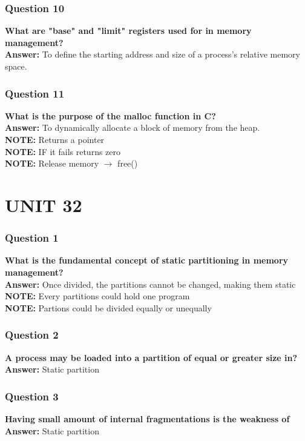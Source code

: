 \documentclass{article}
\begin{document}
\subsubsection*{Question 10}
\textbf{What are "base" and "limit" registers used for in memory management?} \\
\textbf{Answer:} To define the starting address and size of a process's relative memory space.

\subsubsection*{Question 11}
\textbf{What is the purpose of the malloc function in C?} \\
\textbf{Answer:} To dynamically allocate a block of memory from the heap. \\
\textbf{NOTE:} Returns a pointer \\
\textbf{NOTE:} IF it fails returns zero \\
\textbf{NOTE:} Release memory $\rightarrow$ free()

\section*{UNIT 32}

\subsubsection*{Question 1}
\textbf{What is the fundamental concept of static partitioning in memory management?} \\
\textbf{Answer:} Once divided, the partitions cannot be changed, making them static \\
\textbf{NOTE:} Every partitions could hold one program \\
\textbf{NOTE:} Partions could be divided equally or unequally

\subsubsection*{Question 2}
\textbf{A process may be loaded into a partition of equal or greater size in?} \\
\textbf{Answer:} Static partition

\subsubsection*{Question 3}
\textbf{Having small amount of internal fragmentations is the weakness of} \\
\textbf{Answer:} Static partition
\end{document}
